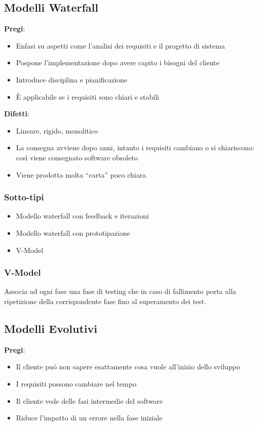 \subsection{Modelli Waterfall}
\textbf{Pregi}:
\begin{itemize}
    \item Enfasi su aspetti come l’analisi dei requisiti e il progetto di sistema
    \item Pospone l’implementazione dopo avere capito i bisogni del cliente
    \item Introduce disciplina e pianificazione
    \item \`E applicabile se i requisiti sono chiari e stabili
\end{itemize}

\noindent \textbf{Difetti}:
\begin{itemize}
    \item Lineare, rigido, monolitico
    \item La consegna avviene dopo anni, intanto i requisiti cambiano o si chiariscono: così viene consegnato software obsoleto
    \item Viene prodotta molta “carta” poco chiara
\end{itemize}

\subsubsection{Sotto-tipi}
\begin{itemize}
    \item Modello waterfall con feedback e iterazioni
    \item Modello waterfall con prototipazione
    \item V-Model
\end{itemize}

\subsubsection{V-Model}
Associa ad ogni fase una fase di testing che in caso di fallimento porta alla ripetizione della corrispondente fase fino al superamento dei test.

\subsection{Modelli Evolutivi}
\textbf{Pregi}:
\begin{itemize}
    \item Il cliente può non sapere esattamente cosa vuole all'inizio dello sviluppo
    \item I requisiti possono cambiare nel tempo
    \item Il cliente vede delle fasi intermedie del software
    \item Riduce l'impatto di un errore nella fase iniziale
\end{itemize}

